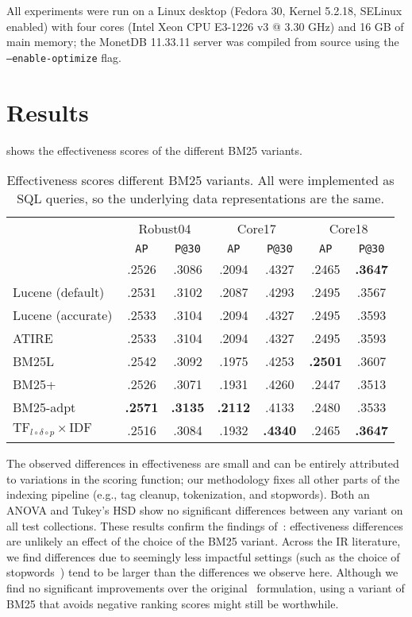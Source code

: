 All experiments were run on a Linux desktop (Fedora 30, Kernel 5.2.18, SELinux enabled) with four cores (Intel Xeon CPU E3-1226 v3 @ 3.30 GHz) and 16 GB of main memory; the MonetDB 11.33.11 server was compiled from source using the \texttt{---enable-optimize} flag.

\section{Results}
 shows the effectiveness scores of the different BM25 variants.  
\begin{table}
	\centering
	\caption{Effectiveness scores different BM25 variants. All were implemented as SQL queries, so the underlying data representations are the same.}
	\label{bm25_variant_results}
	\begin{tabular}{l c c c c c c}
		\toprule
		&\multicolumn{2}{c}{Robust04}&\multicolumn{2}{c}{Core17}&\multicolumn{2}{c}{Core18}\\
		&\texttt{AP}&\texttt{P@30}&\texttt{AP}&\texttt{P@30}&\texttt{AP}&\texttt{P@30}\\
		\midrule
		{\small \citeauthor{bm25-robertson}} & .2526 & .3086 & .2094 & .4327 & .2465 & \textbf{.3647} \\ 
		{\small Lucene (default)} & .2531 & .3102 & .2087 & .4293 & .2495 & .3567 \\ 
		{\small Lucene (accurate)} & .2533 & .3104 & .2094 & .4327 & .2495 & .3593 \\ 
		{\small ATIRE} & .2533 & .3104 & .2094 & .4327 & .2495 & .3593 \\ 
		{\small BM25L} & .2542 & .3092 & .1975 & .4253 & \textbf{.2501} & .3607 \\ 
		{\small BM25+} & .2526 & .3071 & .1931 & .4260 & .2447 & .3513 \\ 
		{\small BM25-adpt} & \textbf{.2571} & \textbf{.3135} & \textbf{.2112} & .4133 & .2480 & .3533\\ 
		{\small $\text{TF}_{l\circ\delta\circ p}\times\text{IDF}$} & .2516 & .3084 & .1932 & \textbf{.4340} & .2465 & \textbf{.3647}\\ 
		\bottomrule
	\end{tabular}
\end{table}
The observed differences in effectiveness are small and can be entirely attributed to variations in the scoring function; our methodology fixes all other parts of the indexing pipeline (e.g., tag cleanup, tokenization, and stopwords). Both an ANOVA and Tukey’s HSD show no significant differences between any variant on all test collections. These results confirm the findings of~\citet{trotman-bm25}: effectiveness differences are unlikely an effect of the choice of the BM25 variant. Across the IR literature, we find differences due to seemingly less impactful settings (such as the choice of stopwords~\citep{stopwords}) tend to be larger than the differences we observe here. Although we find no significant improvements over the original~\citep{bm25-robertson} formulation, using a variant of BM25 that avoids negative ranking scores might still be worthwhile.

